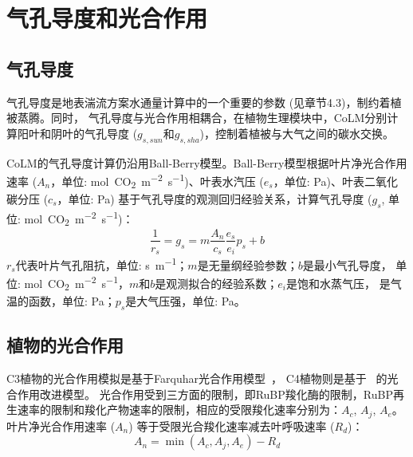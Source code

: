 \chapter{气孔导度和光合作用}


\section{气孔导度}\label{气孔导度}
气孔导度是地表湍流方案水通量计算中的一个重要的参数 (见章节4.3)，制约着植被蒸腾。同时，
气孔导度与光合作用相耦合，在植物生理模块中，CoLM分别计算阳叶和阴叶的气孔导度 ($g_{s,sun}$和$g_{s,sha}$)，控制着植被与大气之间的碳水交换。


CoLM的气孔导度计算仍沿用Ball-Berry模型。Ball-Berry模型根据叶片净光合作用速率 
($A_n$，单位: \unit{mol.CO_2.m^{-2}.s^{-1}})、叶表水汽压 ($e_s$，单位: Pa)、叶表二氧化碳分压 ($c_s$，单位: Pa) 
基于气孔导度的观测回归经验关系，计算气孔导度 ($g_s$, 单位: \unit{mol.CO_2.m^{-2}.s^{-1}})： 
\begin{equation}\label{rs_a1}
\frac{1}{r_{s}}=g_{s}=m \frac{A_{n}}{c_{s}} \frac{e_{s}}{e_{i}} p_{s}+b
\end{equation}
$r_s$代表叶片气孔阻抗，单位: \unit{s.m^{-1}}；$m$是无量纲经验参数；$b$是最小气孔导度，
单位: \unit{mol.CO_2.m^{-2}.s^{-1}}，$m$和$b$是观测拟合的经验系数；$e_i$是饱和水蒸气压，
是气温的函数，单位: Pa；$p_s$是大气压强，单位: Pa。


\section{植物的光合作用}\label{植物的光合作用}
C3植物的光合作用模拟是基于Farquhar光合作用模型~\citep{farquhar1980biochemical}，
C4植物则是基于~\citet{collatz1992} 的光合作用改进模型。
光合作用受到三方面的限制，即RuBP羧化酶的限制，RuBP再生速率的限制和羧化产物速率的限制，相应的受限羧化速率分别为：$A_{c}$, $A_{j}$, $A_{e}$。叶片净光合作用速率 ($A_{n}$) 等于受限光合羧化速率减去叶呼吸速率 ($R_d$)：
\begin{equation}\label{An1}
A_{n}=\min \left(A_{c}, A_{j}, A_{e}\right)-R_{d}
\end{equation}


